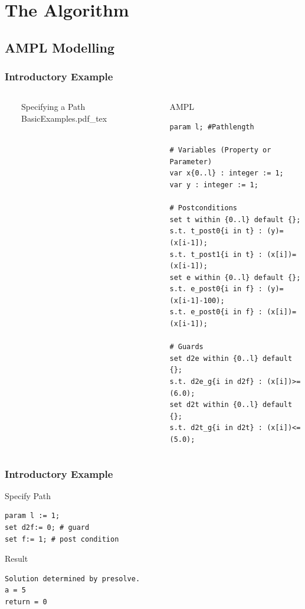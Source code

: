 \documentclass{beamer}
\begin{document}
\section{The Algorithm}
\subsection{AMPL Modelling}
\begin{frame}[fragile]
\frametitle{Introductory Example}
\begin{columns}
  \ 
	\begin{block}{Specifying a Path} 
	\def\svgwidth{\textwidth}
	\scriptsize
	{BasicExamples.pdf_tex}
	\end{block} 
\column{.6\textwidth} \ 
	\begin{block}{AMPL} 
		\begin{lstlisting}[basicstyle=\ttfamily\scriptsize,language=ampl]
param l; #Pathlength

# Variables (Property or Parameter)
var x{0..l} : integer := 1;
var y : integer := 1;

# Postconditions
set t within {0..l} default {};
s.t. t_post0{i in t} : (y)=(x[i-1]);
s.t. t_post1{i in t} : (x[i])=(x[i-1]);
set e within {0..l} default {};
s.t. e_post0{i in f} : (y)=(x[i-1]-100);
s.t. e_post0{i in f} : (x[i])=(x[i-1]);

# Guards
set d2e within {0..l} default {};
s.t. d2e_g{i in d2f} : (x[i])>=(6.0);
set d2t within {0..l} default {};
s.t. d2t_g{i in d2t} : (x[i])<=(5.0);
\end{lstlisting}
	\end{block} 
\end{columns}
\end{frame}

\begin{frame}[fragile]
\frametitle{Introductory Example}
	\begin{block}{Specify Path} 
		\begin{lstlisting}[basicstyle=\ttfamily\small,language=ampl]
param l := 1;
set d2f:= 0; # guard 
set f:= 1; # post condition
		\end{lstlisting}
	\end{block} 
	\begin{block}{Result} 
		\begin{lstlisting}[basicstyle=\ttfamily\small,language=ampl]
Solution determined by presolve.
a = 5
return = 0
		\end{lstlisting}
	\end{block}
\end{frame}
\end{document}
